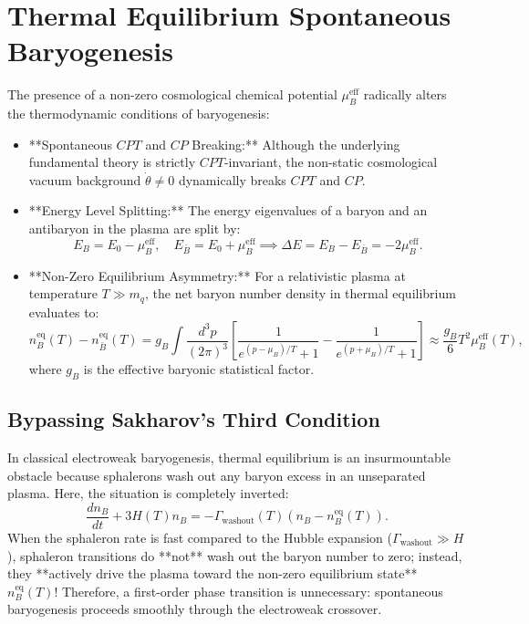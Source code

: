 \documentclass[11pt,a4paper]{article}
\begin{document}
\section{Thermal Equilibrium Spontaneous Baryogenesis}

The presence of a non-zero cosmological chemical potential $\mu_B^{\mathrm{eff}}$ radically alters the thermodynamic conditions of baryogenesis:
\begin{itemize}
    \item **Spontaneous $CPT$ and $CP$ Breaking:** Although the underlying fundamental theory is strictly $CPT$-invariant, the non-static cosmological vacuum background $\dot{\theta} \neq 0$ dynamically breaks $CPT$ and $CP$.
    \item **Energy Level Splitting:** The energy eigenvalues of a baryon and an antibaryon in the plasma are split by:
    \begin{equation}
    E_B = E_0 - \mu_B^{\mathrm{eff}}, \quad E_{\bar{B}} = E_0 + \mu_B^{\mathrm{eff}} \implies \Delta E = E_B - E_{\bar{B}} = - 2 \mu_B^{\mathrm{eff}}.
    \end{equation}
    \item **Non-Zero Equilibrium Asymmetry:** For a relativistic plasma at temperature $T \gg m_q$, the net baryon number density in thermal equilibrium evaluates to:
    \begin{equation}
    n_B^{\mathrm{eq}}(T) - n_{\bar{B}}^{\mathrm{eq}}(T) = g_B \int \frac{d^3p}{(2\pi)^3} \left[ \frac{1}{e^{(p - \mu_B)/T} + 1} - \frac{1}{e^{(p + \mu_B)/T} + 1} \right] \approx \frac{g_B}{6} T^2 \mu_B^{\mathrm{eff}}(T),
    \label{eq:n_B_eq}
    \end{equation}
    where $g_B$ is the effective baryonic statistical factor.
\end{itemize}

\subsection{Bypassing Sakharov's Third Condition}
In classical electroweak baryogenesis, thermal equilibrium is an insurmountable obstacle because sphalerons wash out any baryon excess in an unseparated plasma. Here, the situation is completely inverted:
\begin{equation}
\frac{dn_B}{dt} + 3 H(T) n_B = - \Gamma_{\mathrm{washout}}(T) \left( n_B - n_B^{\mathrm{eq}}(T) \right).
\label{eq:boltzmann_ode}
\end{equation}
When the sphaleron rate is fast compared to the Hubble expansion ($\Gamma_{\mathrm{washout}} \gg H$), sphaleron transitions do **not** wash out the baryon number to zero; instead, they **actively drive the plasma toward the non-zero equilibrium state** $n_B^{\mathrm{eq}}(T)$! Therefore, a first-order phase transition is unnecessary: spontaneous baryogenesis proceeds smoothly through the electroweak crossover.
\end{document}
